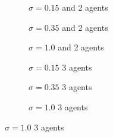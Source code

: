 \documentclass{article}
\begin{document}
            \clearpage
                \begin{figure}[ht!] 
                        \centering
                        \begin{subfigure}[b]{0.3\linewidth}
                            \centering
                            
                            \caption{$\sigma=0.15$ and 2 agents} 
                            \label{fig14:a} 
                            \vspace{4ex}
                        \end{subfigure}%
                        \begin{subfigure}[b]{0.3\linewidth}
                            \centering
                            
                            \caption{$\sigma=0.35$ and 2 agents} 
                            \label{fig14:b} 
                            \vspace{4ex}
                        \end{subfigure} 
                        \begin{subfigure}[b]{0.3\linewidth}
                            \centering
                            
                            \caption{$\sigma=1.0$ and 2 agents} 
                            \label{fig14:c}
                            \vspace{4ex}
                        \end{subfigure}%
                        
                        
                        \begin{subfigure}[b]{0.3\linewidth}
                            \centering
                            
                            \caption{$\sigma=0.15$ 3 agents }  
                            \label{fig14:d} 
                            \vspace{4ex}
                        \end{subfigure}
                        \begin{subfigure}[b]{0.3\linewidth}
                            \centering
                            
                            \caption{$\sigma=0.35$ 3 agents} 
                            \label{fig14:e} 
                            \vspace{4ex}
                        \end{subfigure}
                        \begin{subfigure}[b]{0.3\linewidth}
                            \centering
                            
                            \caption{$\sigma=1.0$ 3 agents } 
                            \label{fig14:f}
                            \vspace{4ex}
                        \end{subfigure} 
    

\end{figure}
\end{document}
